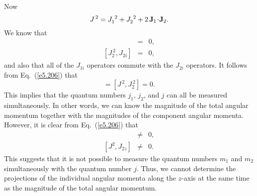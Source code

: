 Now
\begin{equation}\label{e5.206}
J^{\,2} = J_1^{~2} + J_2^{~2} + 2\,{\bf J}_1 \!\cdot\! {\bf J}_2.
\end{equation}
We know that
\begin{eqnarray}
[J_1^{~2}, J_{1i} ] &=& 0,\\[0.5ex]
[J_2^{~2}, J_{2i} ] &=& 0,
\end{eqnarray}
and also that all of the $J_{1i}$ operators commute with the $J_{2i}$ operators. 
It follows from Eq.~(\ref{e5.206}) that
\begin{equation}
[J^{\,2}, J_1^{~2}] = [J^{\,2}, J_2^{~2}] = 0.
\end{equation}
This implies  that the quantum numbers $j_1$, $j_2$, and $j$ can all be measured
simultaneously. In other words, we can know the magnitude of the total
angular momentum  together with the magnitudes of the component
angular momenta. However, it is clear from Eq.~(\ref{e5.206})
that
\begin{eqnarray}
[J^2, J_{1z}] &\neq& 0,\\[0.5ex]
[J^2, J_{2z}] &\neq& 0.
\end{eqnarray}
This suggests  that it is not possible to measure the quantum numbers $m_1$ and $m_2$
simultaneously with the quantum number $j$. Thus, we cannot determine
the projections of the individual angular momenta along the $z$-axis
at the same time as the magnitude of the total angular momentum.

